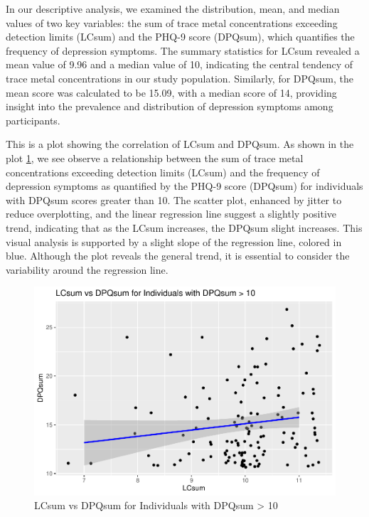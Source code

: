 \documentclass[
  man,floatsintext]{apa6}
\begin{document}
In our descriptive analysis, we examined the distribution, mean, and median values of two key variables: the sum of trace metal concentrations exceeding detection limits (LCsum) and the PHQ-9 score (DPQsum), which quantifies the frequency of depression symptoms. The summary statistics for LCsum revealed a mean value of 9.96 and a median value of 10, indicating the central tendency of trace metal concentrations in our study population. Similarly, for DPQsum, the mean score was calculated to be 15.09, with a median score of 14, providing insight into the prevalence and distribution of depression symptoms among participants.

This is a plot showing the correlation of LCsum and DPQsum. As shown in the plot \ref{fig:LCDPQ-plot}, we see observe a relationship between the sum of trace metal concentrations exceeding detection limits (LCsum) and the frequency of depression symptoms as quantified by the PHQ-9 score (DPQsum) for individuals with DPQsum scores greater than 10. The scatter plot, enhanced by jitter to reduce overplotting, and the linear regression line suggest a slightly positive trend, indicating that as the LCsum increases, the DPQsum slight increases. This visual analysis is supported by a slight slope of the regression line, colored in blue. Although the plot reveals the general trend, it is essential to consider the variability around the regression line.

\begin{figure}
\centering
\includegraphics{nhanes2017_files/figure-latex/LCDPQ-plot-1.pdf}
\caption{\label{fig:LCDPQ-plot}LCsum vs DPQsum for Individuals with DPQsum \textgreater{} 10}
\end{figure}
\end{document}
